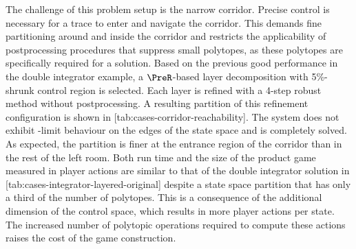    The challenge of this problem setup is the narrow corridor.
    Precise control is necessary for a trace to enter and navigate the corridor.
    This demands fine partitioning around and inside the corridor and restricts the applicability of postprocessing procedures that suppress small polytopes, as these polytopes are specifically required for a solution.
    Based on the previous good performance in the double integrator example, a $\PreR$-based layer decomposition with 5\%-shrunk control region is selected.
    Each layer is refined with a 4-step robust method without postprocessing.
    A resulting partition of this refinement configuration is shown in [tab:cases-corridor-reachability].
    The system does not exhibit \epsilon-limit behaviour on the edges of the state space and is completely solved.
    As expected, the partition is finer at the entrance region of the corridor than in the rest of the left room.
    Both run time and the size of the product game measured in player actions are similar to that of the double integrator solution in [tab:cases-integrator-layered-original] despite a state space partition that has only a third of the number of polytopes.
    This is a consequence of the additional dimension of the control space, which results in more player actions per state.
    The increased number of polytopic operations required to compute these actions raises the cost of the game construction.

\stopsubsection


\startsubsection[title={Reachability Controller},reference=sec:cases-corridor-synthesis]


